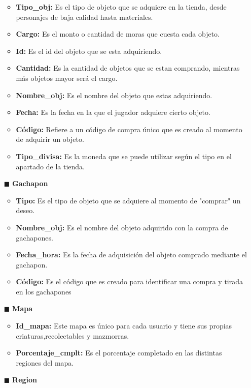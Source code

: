 \documentclass{report}
\begin{document}
\begin{itemize}
\begin{itemize}
            \item \textbf{Tipo\_obj: } Es el tipo de objeto que se adquiere en la tienda, desde personajes de baja calidad hasta materiales.
            \item \textbf{Cargo: } Es el monto o cantidad de moras que cuesta cada objeto.
            \item \textbf{Id: } Es el id del objeto que se esta adquiriendo.
            \item \textbf{Cantidad: } Es la cantidad de objetos que se estan comprando, mientras más objetos mayor será el cargo.
            \item \textbf{Nombre\_obj: } Es el nombre del objeto que estas adquiriendo.
            \item \textbf{Fecha: } Es la fecha en la que el jugador adquiere cierto objeto.
            \item \textbf{Código: } Refiere a un código de compra único que es creado al momento de adquirir un objeto.
            \item \textbf{Tipo\_divisa:} Es la moneda que se puede utilizar según el tipo en el apartado de la tienda.
        \end{itemize}
    \item[$\blacksquare$]\textbf{Gachapon}
        \begin{itemize}
            \item \textbf{Tipo: } Es el tipo de objeto que se adquiere al momento de "comprar" un deseo. 
            \item \textbf{Nombre\_obj: } Es el nombre del objeto adquirido con la compra de gachapones.
            \item \textbf{Fecha\_hora:} Es la fecha de adquisición del objeto comprado mediante el gachapon.
            \item \textbf{Código: } Es el código que es creado para identificar una compra y tirada en los gachapones
        \end{itemize}
    \item[$\blacksquare$]\textbf{Mapa}
        \begin{itemize}
            \item \textbf{Id\_mapa:} Este mapa es único para cada usuario y tiene sus propias criaturas,recolectables y mazmorras.
            \item \textbf{Porcentaje\_cmplt:} Es el porcentaje completado en las distintas regiones del mapa.
        \end{itemize}
    \item[$\blacksquare$]\textbf{Region}

\end{itemize}
\end{document}
